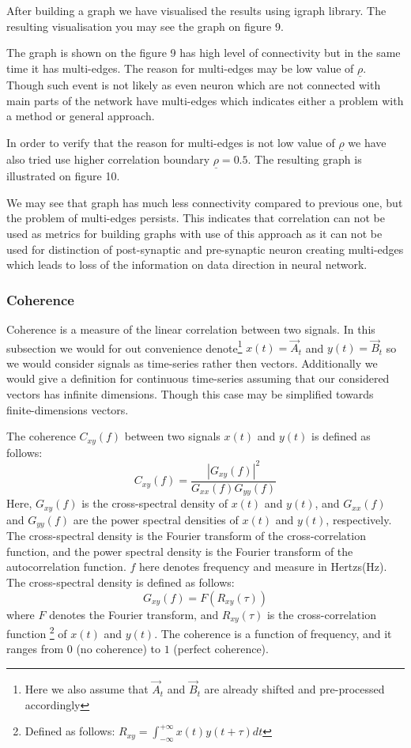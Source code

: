 \documentclass{article}
\begin{document}
	After building a graph we have visualised the results using igraph library. The resulting visualisation you may
	see the graph on figure 9.

	The graph is shown on the figure 9 has high level of connectivity but in the same time it has multi-edges.
	The reason for multi-edges may be low value of $\underline{\rho}$.
	Though such event is not likely as even neuron which are not connected with main parts of the network have multi-edges
	which indicates either a problem with a method or general approach.

	In order to verify that the reason for multi-edges is not low value of $\underline{\rho}$ we have also tried use
	higher correlation boundary $\underline{\rho} = 0.5$.
	The resulting graph is illustrated on figure 10.

	We may see that graph has much less connectivity compared to previous one, but the problem of multi-edges persists.
	This indicates that correlation can not be used as metrics for building graphs with use of this approach as it can not
	be used for distinction of post-synaptic and pre-synaptic neuron creating multi-edges which leads to loss of the information
	on data direction in neural network.
	
	\subsubsection{Coherence}
	Coherence is a measure of the linear correlation between two signals.
	In this subsection we would for out convenience denote\footnote{Here we also assume that $\vec{A}_t$ and $\vec{B}_t$
	 are already shifted and pre-processed accordingly
	}
	$x(t)=\vec{A}_t$ and $y(t)=\vec{B}_t$ so we would consider
	signals as time-series rather then vectors.
	Additionally we would give a definition for continuous time-series assuming that our considered vectors has infinite
	dimensions.
	Though this case may be simplified towards finite-dimensions vectors.

	The coherence $C_{xy}(f)$ between two signals $x(t)$ and $y(t)$ is defined as follows:
    \[
	C_{xy}(f) = \frac{|G_{xy}(f)|^2}{G_{xx}(f) G_{yy}(f)}
    \]
	Here, $G_{xy}(f)$ is the cross-spectral density of $x(t)$ and $y(t)$,
	and $G_{xx}(f)$ and $G_{yy}(f)$ are the power spectral densities of $x(t)$ and $y(t)$, respectively.
	The cross-spectral density is the Fourier transform of the cross-correlation function, and the power spectral density
	is the Fourier transform of the autocorrelation function. $f$ here denotes frequency and measure in Hertzs(Hz).
	The cross-spectral density is defined as follows:
	\[
		G_{xy}(f) = F(R_{xy}(\tau))
	\]
	where $F$ denotes the Fourier transform,
	and $R_{xy}(\tau)$ is the cross-correlation function
	\footnote{
		Defined as follows: $R_{xy}=\int_{-\infty}^{+\infty}x(t)y(t+\tau)dt$
	}
	of $x(t)$ and $y(t)$.
	The coherence is a function of frequency, and it ranges from $0$ (no coherence) to $1$ (perfect coherence).
\end{document}

